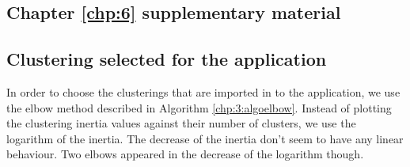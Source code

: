 \begin{appendices}






\chapter{Chapter \ref{chp:6} supplementary material} \label{app:chap6}

\section{Clustering selected for the application}\label{app:chap6:1}

In order to choose the clusterings that are imported in to the application, we use the elbow method described in Algorithm \ref{chp:3:algoelbow}. Instead of plotting the clustering inertia values against their number of clusters, we use the logarithm of the inertia. The decrease of the inertia don't seem to have any linear behaviour. Two elbows appeared in the decrease of the logarithm though.  


\end{appendices}
